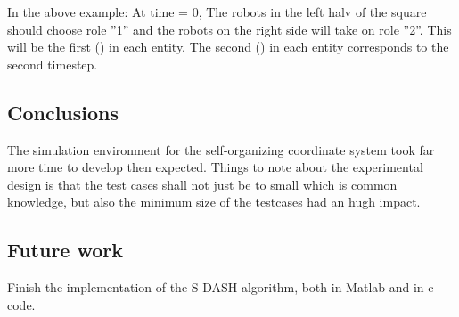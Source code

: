 In the above example: At time = 0, The robots in the left halv of the square should choose role ”1”  and the robots on the right side will take on role ”2”. This will be the first () in each entity. The second () in each entity corresponds to the second timestep. 





\subsection{Conclusions}
The simulation environment for the self-organizing coordinate system took far more time to develop then expected.
Things to note about the experimental design is that the test cases shall not just be to small which is common knowledge, but also the minimum size of the testcases had an hugh impact.
\subsection{Future work}
Finish the implementation of the S-DASH algorithm, both in Matlab and in c code.

